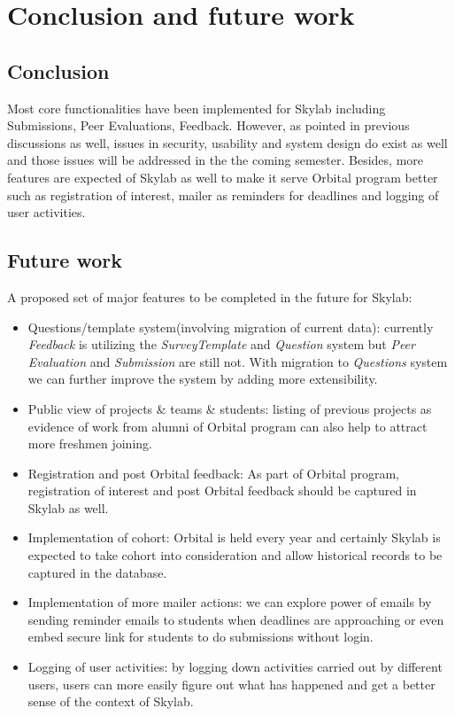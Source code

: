 \chapter{Conclusion and future work} \label{conclusionandfuturework}

\section{Conclusion}

Most core functionalities have been implemented for Skylab including Submissions, Peer Evaluations, Feedback. However, as pointed in previous discussions as well, issues in security, usability and system design do exist as well and those issues will be addressed in the the coming semester. Besides, more features are expected of Skylab as well to make it serve Orbital program better such as registration of interest, mailer as reminders for deadlines and logging of user activities.

\section{Future work}

A proposed set of major features to be completed in the future for Skylab:

\begin{itemize}
  \item Questions/template system(involving migration of current data): currently \textit{Feedback} is utilizing the \textit{SurveyTemplate} and \textit{Question} system but \textit{Peer Evaluation} and \textit{Submission} are still not. With migration to \textit{Questions} system we can further improve the system by adding more extensibility.
  \item Public view of projects \& teams \& students: listing of previous projects as evidence of work from alumni of Orbital program can also help to attract more freshmen joining.
  \item Registration and post Orbital feedback: As part of Orbital program, registration of interest and post Orbital feedback should be captured in Skylab as well.
  \item Implementation of cohort: Orbital is held every year and certainly Skylab is expected to take cohort into consideration and allow historical records to be captured in the database.
  \item Implementation of more mailer actions: we can explore power of emails by sending reminder emails to students when deadlines are approaching or even embed secure link for students to do submissions without login.
  \item Logging of user activities: by logging down activities carried out by different users, users can more easily figure out what has happened and get a better sense of the context of Skylab.
\end{itemize}
